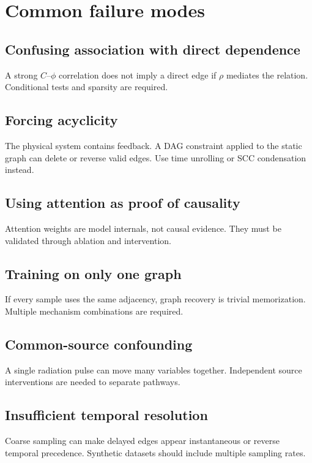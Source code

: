 \documentclass[11pt]{article}
\begin{document}
\section{Common failure modes}

\subsection{Confusing association with direct dependence}

A strong \(C\)--\(\phi\) correlation does not imply a direct edge if \(\rho\) mediates the relation. Conditional tests and sparsity are required.

\subsection{Forcing acyclicity}

The physical system contains feedback. A DAG constraint applied to the static graph can delete or reverse valid edges. Use time unrolling or SCC condensation instead.

\subsection{Using attention as proof of causality}

Attention weights are model internals, not causal evidence. They must be validated through ablation and intervention.

\subsection{Training on only one graph}

If every sample uses the same adjacency, graph recovery is trivial memorization. Multiple mechanism combinations are required.

\subsection{Common-source confounding}

A single radiation pulse can move many variables together. Independent source interventions are needed to separate pathways.

\subsection{Insufficient temporal resolution}

Coarse sampling can make delayed edges appear instantaneous or reverse temporal precedence. Synthetic datasets should include multiple sampling rates.
\end{document}
